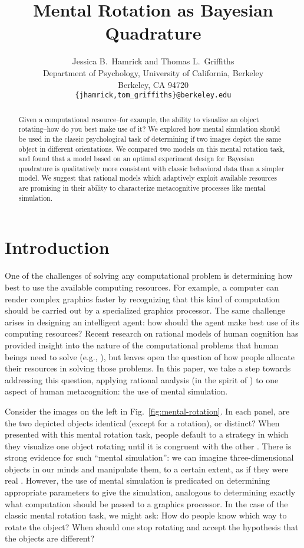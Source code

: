 \documentclass{article} %
\title{Mental Rotation as Bayesian Quadrature}
\author{Jessica B.~Hamrick and Thomas L.~Griffiths\\
  Department of Psychology, University of California, Berkeley\\
  Berkeley, CA 94720\\
  \texttt{\{jhamrick,tom\_griffiths\}@berkeley.edu}}
\begin{document}
\maketitle

\begin{abstract}
  Given a computational resource--for example, the ability to
  visualize an object rotating--how do you best make use of it? We
  explored how mental simulation should be used in the classic
  psychological task of determining if two images depict the same
  object in different orientations. We compared two models on this
  mental rotation task, and found that a model based on an optimal
  experiment design for Bayesian quadrature is qualitatively more
  consistent with classic behavioral data than a simpler model. We
  suggest that rational models which adaptively exploit available
  resources are promising in their ability to characterize
  metacognitive processes like mental simulation.
\end{abstract}

\section{Introduction}

One of the challenges of solving any computational problem is
determining how best to use the available computing resources. For
example, a computer can render complex graphics faster by recognizing
that this kind of computation should be carried out by a specialized
graphics processor. The same challenge arises in designing an
intelligent agent: how should the agent make best use of its computing
resources? Recent research on rational models of human cognition has
provided insight into the nature of the computational problems that
human beings need to solve (e.g., \cite{Chater:1999wp,tenenbaumkgg11}),
but leaves open the question of how people allocate their resources in
solving those problems. In this paper, we take a step towards
addressing this question, applying rational analysis (in the spirit of
\cite{Marr:1983to,anderson90,Shepard:1987tt}) to one aspect of human
metacognition: the use of mental simulation.

Consider the images on the left in Fig.~\ref{fig:mental-rotation}. In
each panel, are the two depicted objects identical (except for a
rotation), or distinct? When presented with this mental rotation task,
people default to a strategy in which they visualize one object
rotating until it is congruent with the other
\cite{Shepard1971}. There is strong evidence for such ``mental
simulation'': we can imagine three-dimensional objects in our minds
and manipulate them, to a certain extent, as if they were real
\cite{Kosslyn:2009tj}.  However, the use of mental simulation is
predicated on determining appropriate parameters to give the
simulation, analogous to determining exactly what computation should
be passed to a graphics processor.  In the case of the classic mental
rotation task, we might ask: How do people know which way to rotate
the object?  When should one stop rotating and accept the hypothesis
that the objects are different?
\end{document}
